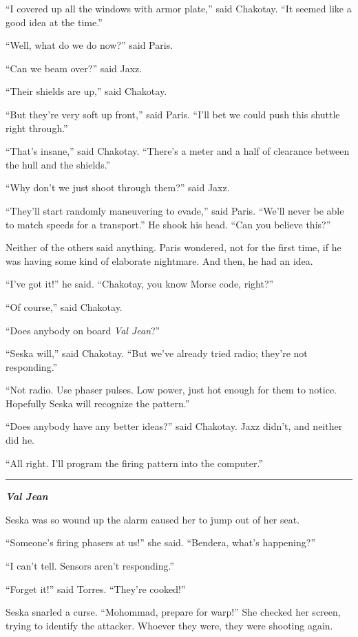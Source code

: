 \documentclass[twoside,letterpaper,12pt]{memoir}
\begin{document}
``I covered up all the windows with armor plate,'' said Chakotay. ``It seemed like a good idea at the time.''

``Well, what do we do now?'' said Paris.

``Can we beam over?'' said Jaxz.

``Their shields are up,'' said Chakotay.

``But they're very soft up front,'' said Paris. ``I'll bet we could push this shuttle right through.''

``That's insane,'' said Chakotay. ``There's a meter and a half of clearance between the hull and the shields.''

``Why don't we just shoot through them?'' said Jaxz.

``They'll start randomly maneuvering to evade,'' said Paris. ``We'll never be able to match speeds for a transport.'' He shook his head. ``Can you believe this?''

Neither of the others said anything. Paris wondered, not for the first time, if he was having some kind of elaborate nightmare. And then, he had an idea.

``I've got it!'' he said. ``Chakotay, you know Morse code, right?''

``Of course,'' said Chakotay.

``Does anybody on board \textit{Val Jean}?''

``Seska will,'' said Chakotay. ``But we've already tried radio; they're not responding.''

``Not radio. Use phaser pulses. Low power, just hot enough for them to notice. Hopefully Seska will recognize the pattern.''

``Does anybody have any better ideas?'' said Chakotay. Jaxz didn't, and neither did he.

``All right. I'll program the firing pattern into the computer.''

\fancybreak{\rule{3cm}{0.4 pt}}
\textit{\textbf{Val Jean}}

Seska was so wound up the alarm caused her to jump out of her seat.

``Someone's firing phasers at us!'' she said. ``Bendera, what’s happening?''

``I can’t tell. Sensors aren’t responding.''

``Forget it!'' said Torres. ``They're cooked!''

Seska snarled a curse. ``Mohommad, prepare for warp!'' She checked her screen, trying to identify the attacker. Whoever they were, they were shooting again.
\end{document}
